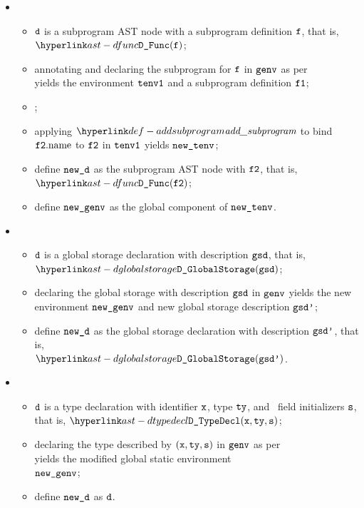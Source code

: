 \ProseParagraph
\OneApplies
\begin{itemize}
  \item {}
  \begin{itemize}
    \item $\texttt{d}$ is a subprogram AST node with a subprogram definition $\texttt{f}$, that is, $\DFunc(\vf)$;
    \item annotating and declaring the subprogram for $\texttt{f}$ in $\texttt{genv}$ as per \\
          yields the environment $\texttt{tenv1}$ and a subprogram definition $\vfone$\ProseOrTypeError;
    \item \Proseannotatesubprogram{$\vfone$}{$\tenv$}{$\vftwo$\ProseOrTypeError};
    \item applying $\addsubprogram$ to bind $\texttt{f2}.\text{name}$ to $\vftwo$ in $\texttt{tenv1}$ yields $\texttt{new\_tenv}$;
    \item define $\texttt{new\_d}$ as the subprogram AST node with $\vftwo$, that is, $\DFunc(\vftwo)$;
    \item define $\texttt{new\_genv}$ as the global component of $\texttt{new\_tenv}$.
  \end{itemize}

  \item {}
  \begin{itemize}
    \item $\texttt{d}$ is a global storage declaration with description $\texttt{gsd}$, that is, \\ $\DGlobalStorage(\gsd)$;
    \item declaring the global storage with description $\texttt{gsd}$ in $\texttt{genv}$ yields the new environment
          $\texttt{new\_genv}$ and new global storage description $\texttt{gsd'}$\ProseOrTypeError;
    \item define $\texttt{new\_d}$ as the global storage declaration with description $\texttt{gsd'}$, that is, \\ $\DGlobalStorage(\gsdp)$.
  \end{itemize}

  \item {}
  \begin{itemize}
    \item $\texttt{d}$ is a type declaration with identifier $\texttt{x}$, type $\texttt{ty}$,
          and \optional\ field initializers $\texttt{s}$, that is, $\DTypeDecl(\vx, \tty, \vs)$;
    \item declaring the type described by $(\texttt{x}, \texttt{ty}, \texttt{s})$ in $\texttt{genv}$
          as per \\
           yields the modified global static environment \\
          $\texttt{new\_genv}$\ProseOrTypeError;
    \item define $\texttt{new\_d}$ as $\texttt{d}$.
  \end{itemize}
\end{itemize}

